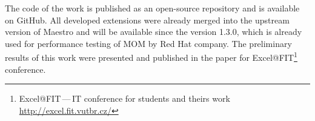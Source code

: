 The code of the work is published as an open-source repository and is available on GitHub. All developed extensions were already merged into the upstream version of Maestro and will be available since the version 1.3.0, which is already used for performance testing of MOM by Red Hat company. The preliminary results of this work were presented and published in the paper for Excel@FIT\footnote{Excel@FIT\,---\,IT conference for students and theirs work \url{http://excel.fit.vutbr.cz/}} conference.



